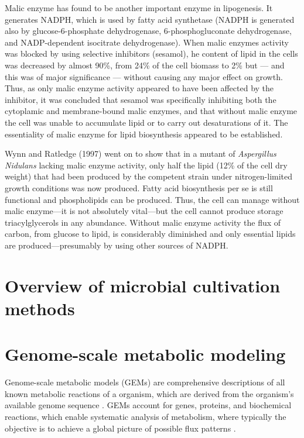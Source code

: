 Malic enzyme has found to be another important enzyme in lipogenesis. It generates 
NADPH, which is used by fatty acid synthetase (NADPH is generated also by 
glucose-6-phosphate dehydrogenase, 6-phosphogluconate dehydrogenase, and NADP-dependent 
isocitrate dehydrogenase). When malic enzymes activity was blocked by using selective inhibitors (sesamol), 
he content of lipid in the cells was decreased by almost 90\%, from 24\% 
of the cell biomass to 2\% but — and this was of major significance — without causing 
any major effect on growth. Thus, as only malic enzyme activity appeared to have been affected 
by the inhibitor, it was concluded that 
sesamol was specifically inhibiting both the cytoplamic and membrane-bound malic 
enzymes, and that without malic enzyme the cell was unable to accumulate lipid or 
to carry out desaturations of it. The essentiality of malic enzyme for lipid 
biosynthesis appeared to be established.
\cite{Ratledge2002}

Wynn and Ratledge (1997) went on to show that in a mutant of \textit{Aspergillus Nidulans} lacking 
malic enzyme activity, only half the lipid (12\% of the cell dry weight) that had been 
produced by the competent strain under nitrogen-limited growth conditions was now 
produced. \cite{Ratledge2002}
Fatty acid biosynthesis per se is still functional and phospholipids can be produced. 
Thus, the cell can manage without malic enzyme—it is not absolutely vital—but the cell
cannot produce storage triacylglycerols in any abundance. Without malic enzyme 
activity the flux of carbon, from glucose to lipid, is considerably diminished and 
only essential lipids are produced—presumably by using other sources of NADPH. \cite{Ratledge2002}




\section{Overview of microbial cultivation methods}


\section{Genome-scale metabolic modeling} %

Genome-scale metabolic models (GEMs) are comprehensive descriptions of all known metabolic reactions of a
organism, which are derived from the organism's available genome sequence \cite{Kerkhoven2014}. 
GEMs account for genes, proteins, and biochemical reactions, which enable systematic
analysis of metabolism, where typically the objective is to achieve a global picture of possible flux
patterns \cite{Kerkhoven2014}\cite{Chen2023}. 

